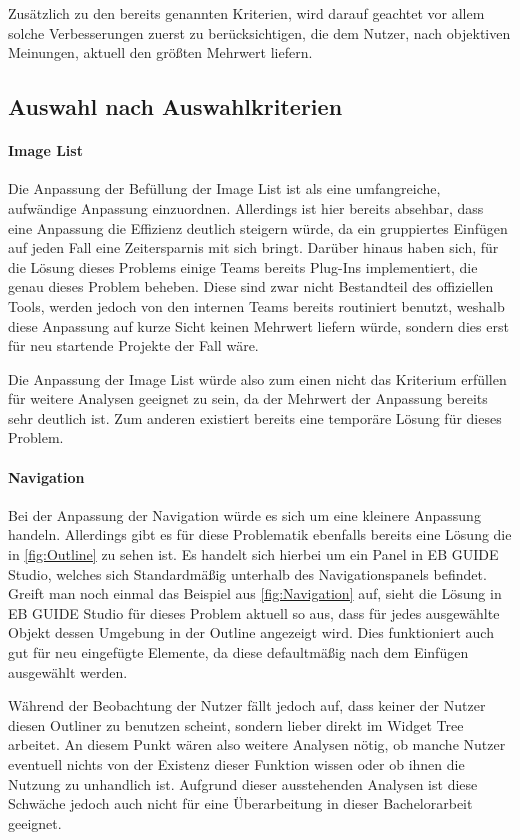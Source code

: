 Zusätzlich zu den bereits genannten Kriterien, wird darauf geachtet  vor allem solche Verbesserungen zuerst zu berücksichtigen, die dem Nutzer, nach objektiven Meinungen, aktuell den größten Mehrwert liefern.

\subsection{Auswahl nach Auswahlkriterien}

\paragraph{Image List}
Die Anpassung der Befüllung der Image List ist als eine umfangreiche, aufwändige Anpassung einzuordnen.
Allerdings ist hier bereits absehbar, dass eine Anpassung die Effizienz deutlich steigern würde, da ein gruppiertes Einfügen auf jeden Fall eine Zeitersparnis mit sich bringt.
Darüber hinaus haben sich, für die Lösung dieses Problems einige Teams bereits Plug-Ins implementiert, die genau dieses Problem beheben. 
Diese sind zwar nicht Bestandteil des offiziellen Tools, werden jedoch von den internen Teams bereits routiniert benutzt, weshalb diese Anpassung auf kurze Sicht keinen Mehrwert liefern würde, sondern dies erst für neu startende Projekte der Fall wäre.

Die Anpassung der Image List würde also zum einen nicht das Kriterium erfüllen für weitere Analysen geeignet zu sein, da der Mehrwert der Anpassung bereits sehr deutlich ist.
Zum anderen existiert bereits eine temporäre Lösung für dieses Problem.

\paragraph{Navigation}
Bei der Anpassung der Navigation würde es sich um eine kleinere Anpassung handeln.
Allerdings gibt es für diese Problematik ebenfalls bereits eine Lösung die in \cref{fig:Outline} zu sehen ist.
Es handelt sich hierbei um ein Panel in EB GUIDE Studio, welches sich Standardmäßig unterhalb des Navigationspanels befindet.
Greift man noch einmal das Beispiel aus \cref{fig:Navigation} auf, sieht die Lösung in EB GUIDE Studio für dieses Problem aktuell so aus, dass für jedes ausgewählte Objekt dessen Umgebung in der Outline angezeigt wird.
Dies funktioniert auch gut für neu eingefügte Elemente, da diese defaultmäßig nach dem Einfügen ausgewählt werden.

Während der Beobachtung der Nutzer fällt jedoch auf, dass keiner der Nutzer diesen Outliner zu benutzen scheint, sondern lieber direkt im Widget Tree arbeitet.
An diesem Punkt wären also weitere Analysen nötig, ob manche Nutzer eventuell nichts von der Existenz dieser Funktion wissen oder ob ihnen die Nutzung zu unhandlich ist.
Aufgrund dieser ausstehenden Analysen ist diese Schwäche jedoch auch nicht für eine Überarbeitung in dieser Bachelorarbeit geeignet.

